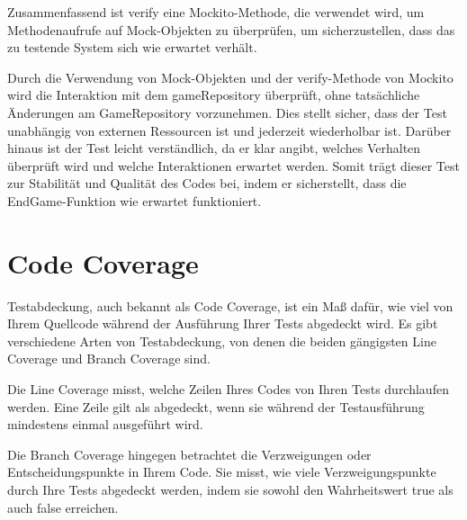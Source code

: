 Zusammenfassend ist verify eine Mockito-Methode, die verwendet wird, um Methodenaufrufe auf Mock-Objekten zu überprüfen, um sicherzustellen, dass das zu testende System sich wie erwartet verhält.

Durch die Verwendung von Mock-Objekten und der verify-Methode von Mockito wird die Interaktion mit dem gameRepository überprüft, ohne tatsächliche Änderungen am GameRepository vorzunehmen. Dies stellt sicher, dass der Test unabhängig von externen Ressourcen ist und jederzeit wiederholbar ist. Darüber hinaus ist der Test leicht verständlich, da er klar angibt, welches Verhalten überprüft wird und welche Interaktionen erwartet werden. Somit trägt dieser Test zur Stabilität und Qualität des Codes bei, indem er sicherstellt, dass die EndGame-Funktion wie erwartet funktioniert.
\section{Code Coverage}
Testabdeckung, auch bekannt als Code Coverage, ist ein Maß dafür, wie viel von Ihrem Quellcode während der Ausführung Ihrer Tests abgedeckt wird. Es gibt verschiedene Arten von Testabdeckung, von denen die beiden gängigsten Line Coverage und Branch Coverage sind.

Die Line Coverage misst, welche Zeilen Ihres Codes von Ihren Tests durchlaufen werden. Eine Zeile gilt als abgedeckt, wenn sie während der Testausführung mindestens einmal ausgeführt wird.

Die Branch Coverage hingegen betrachtet die Verzweigungen oder Entscheidungspunkte in Ihrem Code. Sie misst, wie viele Verzweigungspunkte durch Ihre Tests abgedeckt werden, indem sie sowohl den Wahrheitswert true als auch false erreichen.

